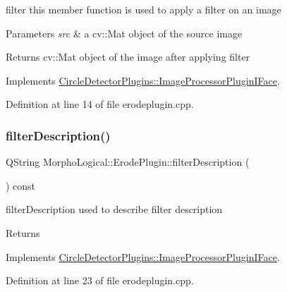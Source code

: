 filter this member function is used to apply a filter on an image 


\begin{DoxyParams}{Parameters}
{\em src} & a cv\+::\+Mat object of the source image \\
\hline
\end{DoxyParams}
\begin{DoxyReturn}{Returns}
cv\+::\+Mat object of the image after applying filter 
\end{DoxyReturn}


Implements \hyperlink{class_circle_detector_plugins_1_1_image_processor_plugin_i_face_a87e2023aca6dffc2ceace999b7ca6b0b}{Circle\+Detector\+Plugins\+::\+Image\+Processor\+Plugin\+I\+Face}.



Definition at line 14 of file erodeplugin.\+cpp.

\mbox{\label{class_morpho_logical_1_1_erode_plugin_a11da98b723970e68dae002337ac36875}} 
\subsubsection{\texorpdfstring{filter\+Description()}{filterDescription()}}
{\footnotesize\ttfamily Q\+String Morpho\+Logical\+::\+Erode\+Plugin\+::filter\+Description (\begin{DoxyParamCaption}{ }\end{DoxyParamCaption}) const\hspace{0.3cm}{\ttfamily [virtual]}}



filter\+Description used to describe filter description 

\begin{DoxyReturn}{Returns}

\end{DoxyReturn}


Implements \hyperlink{class_circle_detector_plugins_1_1_image_processor_plugin_i_face_a5003fd77a4bb84befee299528241d4e5}{Circle\+Detector\+Plugins\+::\+Image\+Processor\+Plugin\+I\+Face}.



Definition at line 23 of file erodeplugin.\+cpp.

